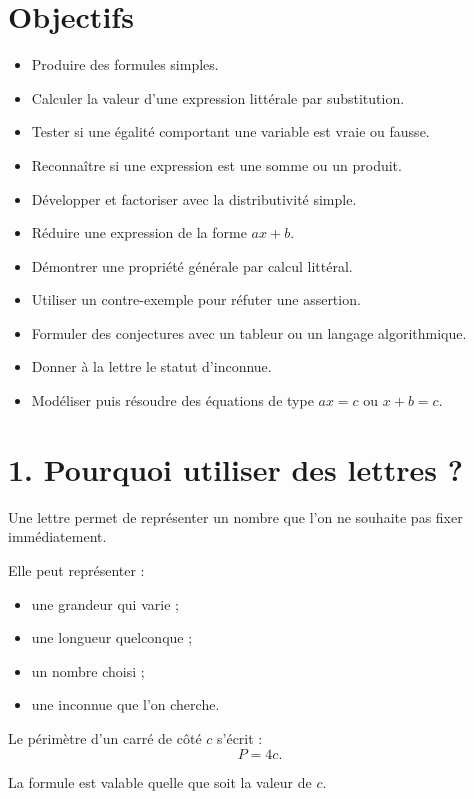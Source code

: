 
\section{Objectifs}

\begin{itemize}
\item Produire des formules simples.
\item Calculer la valeur d'une expression littérale par substitution.
\item Tester si une égalité comportant une variable est vraie ou fausse.
\item Reconnaître si une expression est une somme ou un produit.
\item Développer et factoriser avec la distributivité simple.
\item Réduire une expression de la forme $ax+b$.
\item Démontrer une propriété générale par calcul littéral.
\item Utiliser un contre-exemple pour réfuter une assertion.
\item Formuler des conjectures avec un tableur ou un langage algorithmique.
\item Donner à la lettre le statut d'inconnue.
\item Modéliser puis résoudre des équations de type $ax=c$ ou $x+b=c$.
\end{itemize}

\section{1. Pourquoi utiliser des lettres ?}

Une lettre permet de représenter un nombre que l'on ne souhaite pas fixer immédiatement.

Elle peut représenter :
\begin{itemize}
\item une grandeur qui varie ;
\item une longueur quelconque ;
\item un nombre choisi ;
\item une inconnue que l'on cherche.
\end{itemize}

\begin{exemple}
Le périmètre d'un carré de côté $c$ s'écrit :
\[
P=4c.
\]

La formule est valable quelle que soit la valeur de $c$.
\end{exemple}

